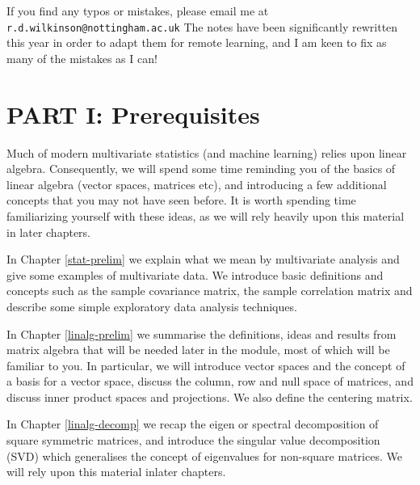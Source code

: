 \documentclass[]{book}
\theoremstyle{definition}
\theoremstyle{definition}
\theoremstyle{definition}
\theoremstyle{remark}
\begin{document}
If you find any typos or mistakes, please email me at \texttt{r.d.wilkinson@nottingham.ac.uk} The notes have been significantly rewritten this year in order to adapt them for remote learning, and I am keen to fix as many of the mistakes as I can!

\hypertarget{part-i-prerequisites}{%
\chapter*{PART I: Prerequisites}\label{part-i-prerequisites}}

Much of modern multivariate statistics (and machine learning) relies upon linear algebra. Consequently, we will spend some time reminding you of the basics of linear algebra (vector spaces, matrices etc), and introducing a few additional concepts that you may not have seen before. It is worth spending time familiarizing yourself with these ideas, as we will rely heavily upon this material in later chapters.

In Chapter \ref{stat-prelim} we explain what we mean by multivariate analysis and give some examples of multivariate data. We introduce basic definitions and concepts such as the sample covariance matrix, the sample correlation matrix and describe some simple exploratory data analysis techniques.

In Chapter \ref{linalg-prelim} we summarise the definitions, ideas and results from matrix algebra that will be needed later in the module, most of which will be familiar to you. In particular, we will introduce vector spaces and the concept of a basis for a vector space, discuss the column, row and null space of matrices, and discuss inner product spaces and projections. We also define the centering matrix.

In Chapter \ref{linalg-decomp} we recap the eigen or spectral decomposition of square symmetric matrices, and introduce the singular value decomposition (SVD) which generalises the concept of eigenvalues for non-square matrices. We will rely upon this material inlater chapters.

\renewcommand{\bY}{\boldsymbol Y}
\renewcommand{\bx}{\boldsymbol x}
\renewcommand{\bX}{\boldsymbol X}
\renewcommand{\bH}{\boldsymbol H}
\renewcommand{\by}{\boldsymbol y}
\renewcommand{\bz}{\boldsymbol z}
\renewcommand{\bS}{\boldsymbol S}
\renewcommand{\bR}{\boldsymbol R}
\renewcommand{\bmu}{\boldsymbol \mu}
\renewcommand{\bSigma}{\boldsymbol \Sigma}
\renewcommand{\bLambda}{\boldsymbol \Lambda}
\renewcommand{\bgamma}{\boldsymbol \gamma}
\renewcommand{\blambda}{\boldsymbol \lambda}
\renewcommand{\bA}{\boldsymbol A}
\renewcommand{\bB}{\boldsymbol B}
\renewcommand{\bD}{\boldsymbol D}
\renewcommand{\bM}{\boldsymbol M}
\renewcommand{\bP}{\boldsymbol P}
\renewcommand{\bQ}{\boldsymbol Q}
\renewcommand{\bT}{\boldsymbol T}
\renewcommand{\bW}{\boldsymbol W}
\renewcommand{\ba}{\boldsymbol a}
\renewcommand{\bb}{\boldsymbol b}
\renewcommand{\bc}{\boldsymbol c}
\renewcommand{\bd}{\boldsymbol d}
\renewcommand{\bh}{\boldsymbol h}
\renewcommand{\bp}{\boldsymbol p}
\renewcommand{\bq}{\boldsymbol q}
\renewcommand{\bu}{\boldsymbol u}
\renewcommand{\bzero}{\boldsymbol 0}
\renewcommand{\mR}{\mathbb R}
\renewcommand{\cR}{\mathcal R}
\end{document}
